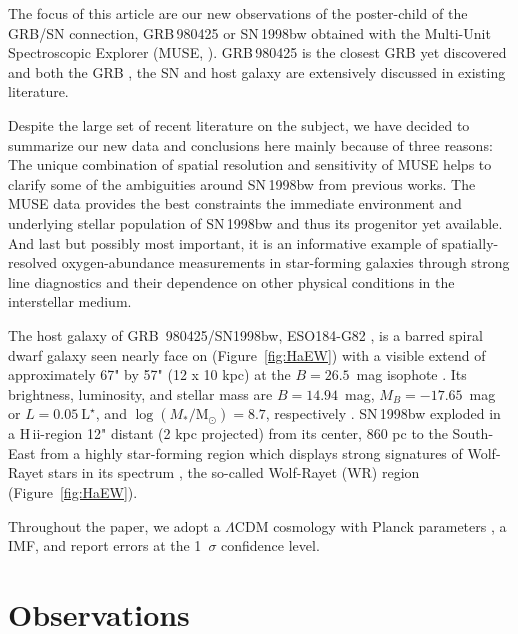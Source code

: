 \documentclass[traditabstract]{aa}
\newcommand{\hii}{\mbox{H\,{\sc ii}}}
\begin{document}
The focus of this article are our new observations of the poster-child of the GRB/SN connection, GRB\,980425 or SN\,1998bw obtained with the Multi-Unit Spectroscopic Explorer (MUSE, \citealp{2010SPIE.7735E..08B}). GRB\,980425 is the closest GRB yet discovered and both the GRB \citep[e.g.,][]{1998Natur.395..670G, 1998Natur.395..663K}, the SN \citep[e.g.,][]{1998Natur.395..672I, 2001ApJ...555..900P, 2006ApJ...640..854M} and host galaxy \citep[e.g.,][]{2000ApJ...542L..89F, 2005NewA...11..103S, 2006A&A...454..103H, 2009ApJ...693..347M} are extensively discussed in existing literature. 

Despite the large set of recent literature on the subject, we have decided to summarize our new data and conclusions here mainly because of three reasons: The unique combination of spatial resolution and sensitivity of MUSE helps to clarify some of the ambiguities around SN\,1998bw from previous works. The MUSE data provides the best constraints the immediate environment and underlying stellar population of SN\,1998bw and thus its progenitor yet available. And last but possibly most important, it is an informative example of spatially-resolved oxygen-abundance measurements in star-forming galaxies through strong line diagnostics and their dependence on other physical conditions in the interstellar medium.

The host galaxy of GRB~980425/SN1998bw, ESO184-G82 \citep{1989spce.book.....L}, is a barred spiral dwarf galaxy \citep{2000ApJ...542L..89F} seen nearly face on (Figure~\ref{fig:HaEW}) with a visible extend of approximately 67" by 57" (12 x 10 kpc) at the $B=26.5$~mag isophote \citep{2005NewA...11..103S}. Its brightness, luminosity, and stellar mass are $B=14.94$~mag, $M_B=-17.65$~mag or $L=0.05~\mathrm{L}^{\star}$, and $\log (M_{*}/\mathrm{M}_{\odot})= 8.7 $, respectively \citep{2005NewA...11..103S, 2014A&A...562A..70M}. SN\,1998bw exploded in a \hii-region 12" distant (2 kpc projected) from its center, 860 pc to the South-East from a highly star-forming region which displays strong signatures of Wolf-Rayet stars in its spectrum \citep{2006A&A...454..103H}, the so-called Wolf-Rayet (WR) region (Figure~\ref{fig:HaEW}).

Throughout the paper, we adopt a $\Lambda$CDM cosmology with Planck parameters \citep{2014A&A...571A..16P}, a \citet{2003PASP..115..763C} IMF, and report errors at the 1~$\sigma$ confidence level.

\section{Observations}
\end{document}
